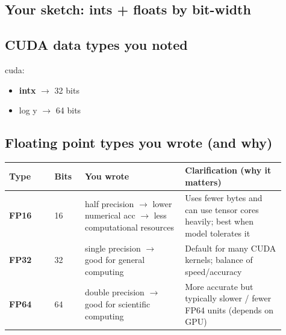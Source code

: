 \documentclass[11pt]{article}
\newcommand{\blue}[1]{\textcolor{myblue}{#1}}
\begin{document}
\subsection*{\blue{Your sketch: ints + floats by bit-width}}
\begin{center}
\end{center}

\subsection*{\blue{CUDA data types you noted}}
cuda:
\begin{itemize}
\item \textbf{intx} $\rightarrow$ 32 bits
\item log y $\rightarrow$ 64 bits
\end{itemize}

\subsection*{\blue{Floating point types you wrote (and why)}}
\begin{center}
\renewcommand{\arraystretch}{1.15}
\begin{tabular}{|>{\bfseries}p{0.15\linewidth}|p{0.10\linewidth}|p{0.33\linewidth}|p{0.33\linewidth}|}
\hline
Type & Bits & You wrote & Clarification (why it matters) \\
\hline
FP16 & 16 & half precision $\rightarrow$ lower numerical acc $\rightarrow$ less computational resources &
Uses fewer bytes and can use tensor cores heavily; best when model tolerates it \\
\hline
FP32 & 32 & single precision $\rightarrow$ good for general computing &
Default for many CUDA kernels; balance of speed/accuracy \\
\hline
FP64 & 64 & double precision $\rightarrow$ good for scientific computing &
More accurate but typically slower / fewer FP64 units (depends on GPU) \\
\hline
\end{tabular}
\end{center}
\end{document}
